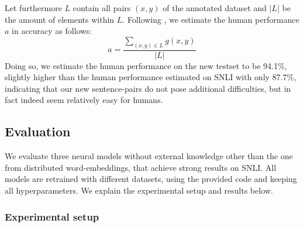 Let furthermore $L$ contain all pairs $(x,y)$ of the annotated dataset and $|L|$ be the amount of elements within $L$. Following \cite{gong2017natural}, we estimate the human performance $a$ in accuracy as follows:
\begin{equation}
a = \frac{\sum_{(x,y) \in L} g(x,y)}{|L|}
\end{equation}
Doing so, we estimate the human performance on the new testset to be 94.1\%, slightly higher than the human performance estimated on \ac{SNLI} with only 87.7\%, indicating that our new sentence-pairs do not pose additional difficulties, but in fact indeed seem relatively easy for humans.
\subsection{Evaluation}
We evaluate three neural models without external knowledge other than the one from distributed word-embeddings, that achieve strong results on \ac{SNLI}. All models are retrained with different datasets, using the provided code and keeping all hyperparameters. We explain the experimental setup and results below. 
\subsubsection{Experimental setup}
